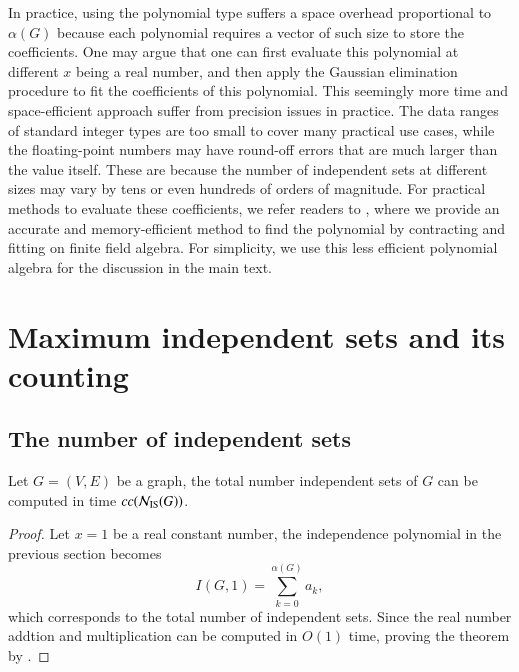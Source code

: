 \documentclass[review, onefignum, onetabnum]{siamart190516}
\begin{document}
In practice, using the polynomial type suffers a space overhead proportional to $\alpha(G)$ because each polynomial requires a vector of such size to store the coefficients. 
One may argue that one can first evaluate this polynomial at different $x$ being a real number,
and then apply the Gaussian elimination procedure to fit the coefficients of this polynomial.
This seemingly more time and space-efficient approach suffer from precision issues in practice.
The data ranges of standard integer types are too small to cover many practical use cases,
while the floating-point numbers may have round-off errors that are much larger than the value itself.
These are because the number of independent sets at different sizes may vary by tens or even hundreds of orders of magnitude.
For practical methods to evaluate these coefficients, we refer readers to , where we provide an accurate and memory-efficient method to find the polynomial by contracting and fitting on finite field algebra.
For simplicity, we use this less efficient polynomial algebra for the discussion in the main text.


\section{Maximum independent sets and its counting}\label{sec:counting}
\subsection{The number of independent sets}
\begin{theorem}\label{thm:complexrealnum}
    Let $G = (V, E)$ be a graph, the total number independent sets of $G$ can be computed in time $cc({\mathcal{N}_{\rm IS}(G)})$.
\end{theorem}
\begin{proof}
Let $x = 1$ be a real constant number, the independence polynomial in the previous section becomes
\begin{equation}
I(G, 1) = \sum_{k=0}^{\alpha(G)}a_k,
\end{equation}
which corresponds to the total number of independent sets.
Since the real number addtion and multiplication can be computed in $O(1)$ time,
proving the theorem by .
\end{proof}
\end{document}
